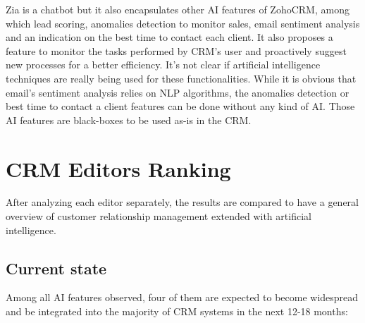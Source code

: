 Zia is a chatbot but it also encapsulates other AI features of ZohoCRM, among which lead scoring, anomalies detection to monitor sales, email sentiment analysis and an indication on the best time to contact each client. It also proposes a feature to monitor the tasks performed by CRM's user and proactively suggest new processes for a better efficiency. It's not clear if artificial intelligence techniques are really being used for these functionalities. While it is obvious that email's sentiment analysis relies on NLP algorithms, the anomalies detection or best time to contact a client features can be done without any kind of AI. Those AI features are black-boxes to be used as-is in the CRM.


\section{CRM Editors Ranking} \label{sec:crm-ranking}
After analyzing each editor separately, the results are compared to have a general overview of customer relationship management extended with artificial intelligence.

\subsection{Current state}
Among all AI features observed, four of them are expected to become widespread and be integrated into the majority of CRM systems in the next 12-18 months:

